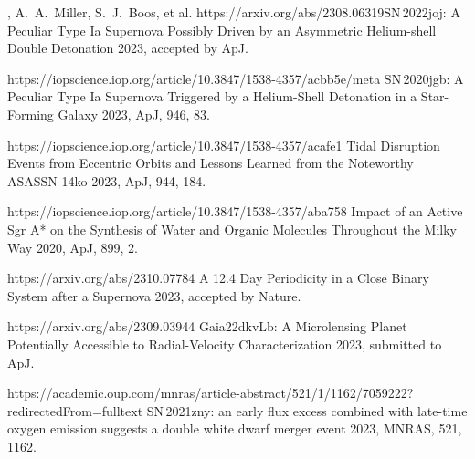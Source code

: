 


\begin{cvpubs}


\cvpub
{ %
\begin{cvitems}
    \item \cvsubpub
    {\Cliu, A.~A.~Miller, S.~J.~Boos, et al.}
    {}
    {https://arxiv.org/abs/2308.06319}{SN\,2022joj: A Peculiar Type Ia Supernova Possibly Driven by an Asymmetric Helium-shell Double Detonation}
    {2023, accepted by ApJ.}
    \item {}
    {}
    {https://iopscience.iop.org/article/10.3847/1538-4357/acbb5e/meta}
    {SN\,2020jgb: A Peculiar Type Ia Supernova Triggered by a Helium-Shell Detonation in a Star-Forming Galaxy}
    {2023, ApJ, 946, 83.}
    \item {}
    {}
    {https://iopscience.iop.org/article/10.3847/1538-4357/acafe1}
    {Tidal Disruption Events from Eccentric Orbits and Lessons Learned from the Noteworthy ASASSN-14ko}
    {2023, ApJ, 944, 184.}
    \item {}
    {}
    {https://iopscience.iop.org/article/10.3847/1538-4357/aba758}
    {Impact of an Active Sgr A* on the Synthesis of Water and Organic Molecules Throughout the Milky Way}
    {2020, ApJ, 899, 2.}
    \item {} 
    {\Cliu}
    {https://arxiv.org/abs/2310.07784}
    {A 12.4 Day Periodicity in a Close Binary System after a Supernova}
    {2023, accepted by Nature.}
    \item {} 
    {\Cliu}
    {https://arxiv.org/abs/2309.03944}
    {Gaia22dkvLb: A Microlensing Planet Potentially Accessible to Radial-Velocity Characterization}
    {2023, submitted to ApJ.}
    \item {} 
    {\Cliu}
    {https://academic.oup.com/mnras/article-abstract/521/1/1162/7059222?redirectedFrom=fulltext}
    {SN\,2021zny: an early flux excess combined with late-time oxygen emission suggests a double white dwarf merger event}
    {2023, MNRAS, 521, 1162.}
\end{cvitems}
}


\end{cvpubs}


